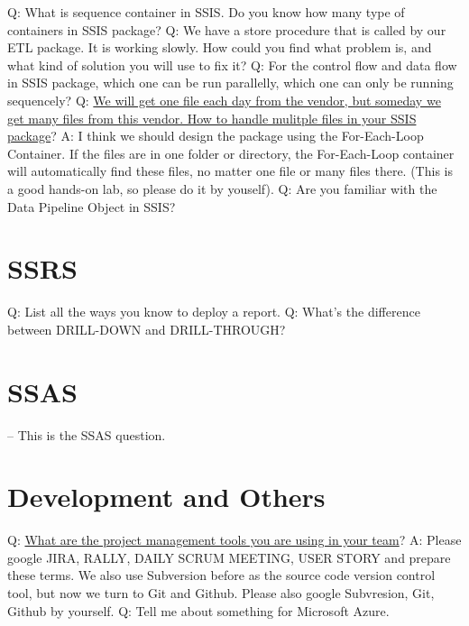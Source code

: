 \documentclass[a4paper,11pt]{article}
\begin{document}
\noindent 
Q: What is sequence container in SSIS. Do you know how many type of containers in SSIS package? \newline \newline
\noindent 
Q: We have a store procedure that is called by our ETL package. It is working slowly. How could you find what problem is, and what kind of solution you will use to fix it?\newline \newline
\noindent 
Q: For the control flow and data flow in SSIS package, which one can be run parallelly, which one can only be running sequencely? \newline \newline
\noindent 
Q: \ul{We will get one file each day from the vendor, but someday we get many files from this vendor. How to handle mulitple files in your SSIS package}? \newline 
A: I think we should design the package using the For-Each-Loop Container. If the files are in one folder or directory, the For-Each-Loop container will automatically find these files, no matter one file or many files there. (This is a good hands-on lab, so please do it by youself).\newline\newline
\noindent 
Q: Are you familiar with the Data Pipeline Object in SSIS? \newline \newline

\section{SSRS}
Q: List all the ways you know to deploy a report.\newline \newline
\noindent 
Q: What's the difference between DRILL-DOWN and DRILL-THROUGH? \newline \newline


\section{SSAS}
-- This is the SSAS question.

\section{Development and Others}
Q: \ul{What are the project management tools you are using in your team}?\newline
A: Please google JIRA, RALLY, DAILY SCRUM MEETING, USER STORY and prepare these terms. We also use Subversion before as the source code version control tool, but now we turn to Git and Github. Please also google Subvresion, Git, Github by yourself.\newline \newline
\noindent 
Q: Tell me about something for Microsoft Azure. \newline \newline
\end{document}
